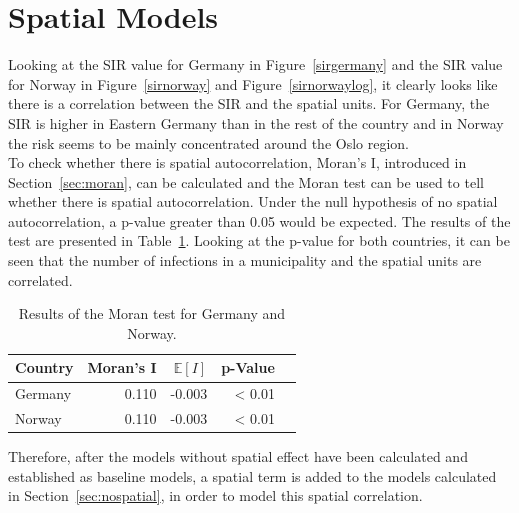 \section{Spatial Models}\label{ch:spatial}
Looking at the SIR value for Germany in Figure~\ref{sirgermany} and the SIR value for Norway in Figure~\ref{sirnorway} and Figure~\ref{sirnorwaylog}, it clearly looks like there is a correlation between the SIR and the spatial units. For Germany, the SIR is higher in Eastern Germany than in the rest of the country and in Norway the risk seems to be mainly concentrated around the Oslo region. \\
To check whether there is spatial autocorrelation, Moran's I, introduced in Section~\ref{sec:moran}, can be calculated and the Moran test can be used to tell whether there is spatial autocorrelation. Under the null hypothesis of no spatial autocorrelation, a p-value greater than 0.05 would be expected. The results of the test are presented in Table~\ref{moranTest}. Looking at the p-value for both countries, it can be seen that the number of infections in a municipality and the spatial units are correlated.
\begin{table}[H] 
\caption{Results of the Moran test for Germany and Norway. \label{moranTest}}
\begin{tabular}{l r r r r}
\toprule
\textbf{Country} & \textbf{Moran's I}	& \textbf{$\mathbb{E}\left[I\right]$}	& \textbf{p-Value} \\
\midrule
Germany & 0.110 & -0.003 & < 0.01 \\
Norway & 0.110 & -0.003 & < 0.01 \\
\bottomrule
\end{tabular}
\end{table}
Therefore, after the models without spatial effect have been calculated and established as baseline models, a spatial term is added to the models calculated in Section~\ref{sec:nospatial}, in order to model this spatial correlation.
